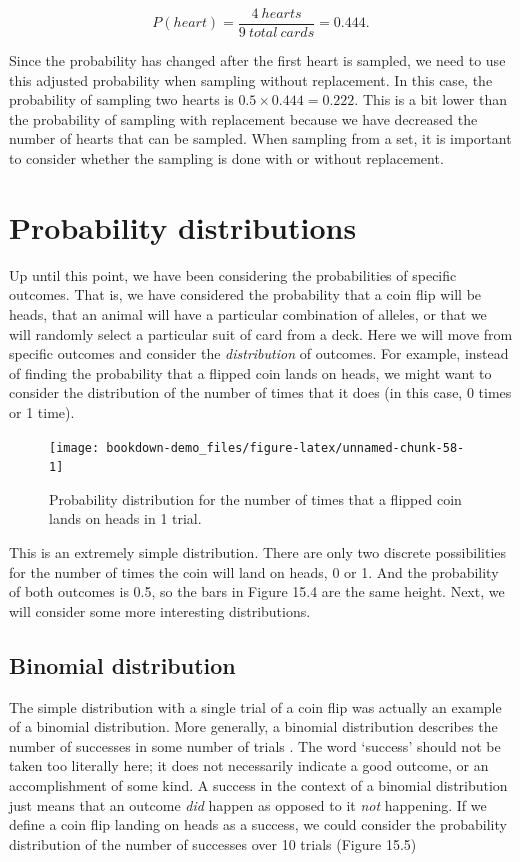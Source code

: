 \documentclass[
]{scrbook}
\begin{document}
\[P(heart) = \frac{4\:hearts}{9\:total\:cards} = 0.444.\]

Since the probability has changed after the first heart is sampled, we need to use this adjusted probability when sampling without replacement.
In this case, the probability of sampling two hearts is \(0.5 \times 0.444 = 0.222\).
This is a bit lower than the probability of sampling with replacement because we have decreased the number of hearts that can be sampled.
When sampling from a set, it is important to consider whether the sampling is done with or without replacement.

\hypertarget{probability-distributions}{%
\section{Probability distributions}\label{probability-distributions}}

Up until this point, we have been considering the probabilities of specific outcomes.
That is, we have considered the probability that a coin flip will be heads, that an animal will have a particular combination of alleles, or that we will randomly select a particular suit of card from a deck.
Here we will move from specific outcomes and consider the \emph{distribution} of outcomes.
For example, instead of finding the probability that a flipped coin lands on heads, we might want to consider the distribution of the number of times that it does (in this case, 0 times or 1 time).

\begin{figure}
\texttt{[image: bookdown-demo\_files/figure-latex/unnamed-chunk-58-1]} \caption{Probability distribution for the number of times that a flipped coin lands on heads in 1 trial.}\label{fig:unnamed-chunk-58}
\end{figure}

This is an extremely simple distribution.
There are only two discrete possibilities for the number of times the coin will land on heads, 0 or 1.
And the probability of both outcomes is 0.5, so the bars in Figure 15.4 are the same height.
Next, we will consider some more interesting distributions.

\hypertarget{binomial-distribution}{%
\subsection{Binomial distribution}\label{binomial-distribution}}

The simple distribution with a single trial of a coin flip was actually an example of a binomial distribution.
More generally, a binomial distribution describes the number of successes in some number of trials \citep{Miller2004}.
The word `success' should not be taken too literally here; it does not necessarily indicate a good outcome, or an accomplishment of some kind.
A success in the context of a binomial distribution just means that an outcome \emph{did} happen as opposed to it \emph{not} happening.
If we define a coin flip landing on heads as a success, we could consider the probability distribution of the number of successes over 10 trials (Figure 15.5)
\end{document}
